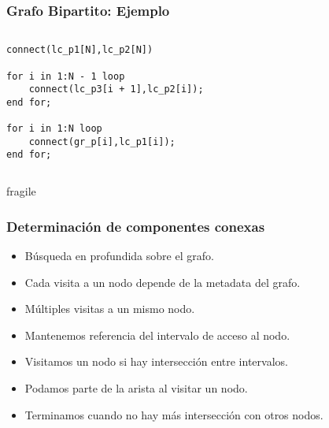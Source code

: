 \begin{frame}[fragile]
\frametitle{Grafo Bipartito: Ejemplo}
\begin{columns} 
\column[t]{7cm}  
\begin{lstlisting}[style=base]
connect(lc_p1[N],lc_p2[N])     
 
for i in 1:N - 1 loop
    connect(lc_p3[i + 1],lc_p2[i]);
end for;

for i in 1:N loop
    connect(gr_p[i],lc_p1[i]);
end for;
\end{lstlisting}

\column[t]{7cm}  

\end{columns}
\end{frame}

\begin{frame}{fragile}
\frametitle{Determinación de componentes conexas}
\begin{itemize}
\setlength\itemsep{1em}
\item Búsqueda en profundida sobre el grafo. 
\item Cada visita a un nodo depende de la metadata del grafo.
\item Múltiples visitas a un mismo nodo. 
\item Mantenemos referencia del intervalo de acceso al nodo. 
\item Visitamos un nodo si hay intersección entre intervalos.
\item Podamos parte de la arista al visitar un nodo.
\item Terminamos cuando no hay más intersección con otros nodos.
\end{itemize}
\end{frame}


